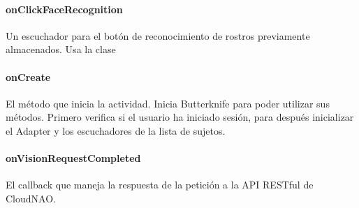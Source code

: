 \paragraph{onClickFaceRecognition}
\label{\detokenize{dev_docs:onclickfacerecognition}}

\begin{fulllineitems}
\label{\detokenize{dev_docs:com.lar.cloudnao.FaceRecognitionActivity.onClickFaceRecognition()}}
Un escuchador para el botón de reconocimiento de rostros previamente almacenados. Usa la clase 

\end{fulllineitems}



\paragraph{onCreate}
\label{\detokenize{dev_docs:id18}}

\begin{fulllineitems}
\label{\detokenize{dev_docs:com.lar.cloudnao.FaceRecognitionActivity.onCreate(Bundle)}}
El método que inicia la actividad. Inicia Butterknife para poder utilizar sus métodos. Primero verifica si el usuario ha iniciado sesión, para después inicializar el Adapter y los escuchadores de la lista de sujetos.

\end{fulllineitems}



\paragraph{onVisionRequestCompleted}
\label{\detokenize{dev_docs:onvisionrequestcompleted}}

\begin{fulllineitems}
\label{\detokenize{dev_docs:com.lar.cloudnao.FaceRecognitionActivity.onVisionRequestCompleted(Object)}}
El callback que maneja la respuesta de la petición a la API RESTful de CloudNAO.

\end{fulllineitems}



